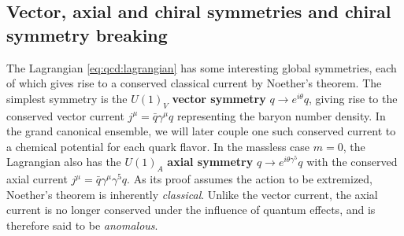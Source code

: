 \subsection{Vector, axial and chiral symmetries and chiral symmetry breaking}
\label{sec:qcd:symmetry}

The Lagrangian \eqref{eq:qcd:lagrangian} has some interesting global symmetries, each of which gives rise to a conserved classical current by Noether's theorem.
The simplest symmetry is the $U(1)_V$ \textbf{vector symmetry} $q \rightarrow e^{i \theta} q$, giving rise to the conserved vector current $j^\mu = \bar{q} \gamma^\mu q$ representing the baryon number density.
In the grand canonical ensemble, we will later couple one such conserved current to a chemical potential for each quark flavor.
In the massless case $m = 0$, the Lagrangian also has the $U(1)_A$ \textbf{axial symmetry} $q \rightarrow e^{i \theta \gamma^5} q$ with the conserved axial current $j^\mu = \bar{q} \gamma^\mu \gamma^5 q$.
As its proof assumes the action to be extremized, Noether's theorem is inherently \emph{classical}.
Unlike the vector current, the axial current is no longer conserved under the influence of quantum effects, and is therefore said to be \emph{anomalous}.

